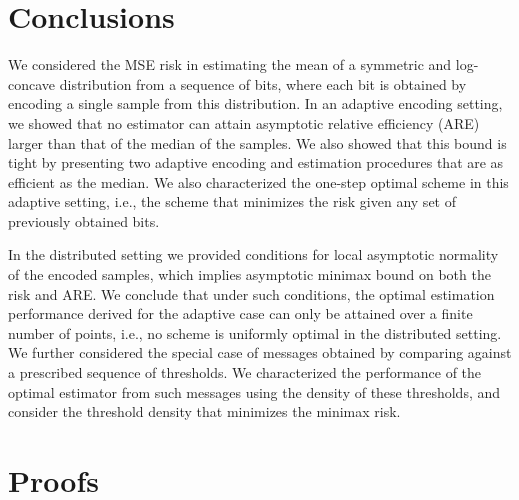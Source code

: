\documentclass[letterpaper, 11pt]{IEEEtran}      %
\begin{document}
\section{Conclusions \label{sec:conclusions}}
We considered the MSE risk in estimating the mean of a symmetric and log-concave distribution from a sequence of bits, where each bit is obtained by encoding a single sample from this distribution. 
%
In an adaptive encoding setting, we showed that no estimator can attain asymptotic relative efficiency (ARE) larger than that of the median of the samples. We also showed that this bound is tight by presenting two adaptive encoding and estimation procedures that are as efficient as the median. 
We also characterized the one-step optimal scheme in this adaptive setting, i.e., the scheme that minimizes the risk given any set of previously obtained bits. %
\par
In the distributed setting we provided conditions for local asymptotic normality of the encoded samples, which implies asymptotic minimax bound on both the risk and ARE. 
%
We conclude that under such conditions, the optimal estimation performance derived for the adaptive case can only be attained over a finite number of points, i.e., no scheme is uniformly optimal in the distributed setting. 
%
We further considered the special case of messages obtained by comparing against a prescribed sequence of thresholds. We characterized the performance of the optimal estimator from such messages using the density of these thresholds, and consider the threshold density that minimizes the minimax risk.
 \\




\onecolumn 

\appendices

\section{Proofs \label{app:proofs}}
\end{document}
